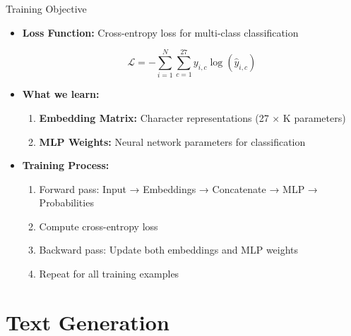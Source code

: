 \documentclass[usenames,dvipsnames]{beamer}
\begin{document}
\begin{frame}{Training Objective}
\begin{itemize}[<+->]
\item \textbf{Loss Function:} Cross-entropy loss for multi-class classification

\begin{equation}
\mathcal{L} = -\sum_{i=1}^{N} \sum_{c=1}^{27} y_{i,c} \log(\hat{y}_{i,c})
\end{equation}

\item \textbf{What we learn:}
\begin{enumerate}
\item \textbf{Embedding Matrix:} Character representations (27 × K parameters)
\item \textbf{MLP Weights:} Neural network parameters for classification
\end{enumerate}

\item \textbf{Training Process:}
\begin{enumerate}
\item Forward pass: Input → Embeddings → Concatenate → MLP → Probabilities
\item Compute cross-entropy loss
\item Backward pass: Update both embeddings and MLP weights
\item Repeat for all training examples
\end{enumerate}
\end{itemize}
\end{frame}

\section{Text Generation}
\end{document}

